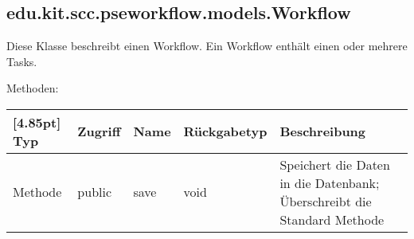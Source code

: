         \subsection{edu.kit.scc.pseworkflow.models.Workflow}
	        Diese Klasse beschreibt einen Workflow. Ein Workflow enthält einen oder mehrere Tasks.
	        
	        Methoden:
	        \begin{center}
	        	\setlength\tabcolsep{5pt}
	        	\renewcommand{\arraystretch}{1.5}
	        	
	        	\begin{tabularx}{\textwidth}{|l|l|l|l|X|}
	        		\hline
	        		\rowcolor[gray]{0.75}[4.85pt]
	        		Typ & Zugriff & Name & Rückgabetyp & Beschreibung \\ \hline 
	        		Methode & public & save & void & Speichert die Daten in die Datenbank; Überschreibt die Standard Methode \\ 
	        		\hline
	        	\end{tabularx}
	        \end{center}
                    
